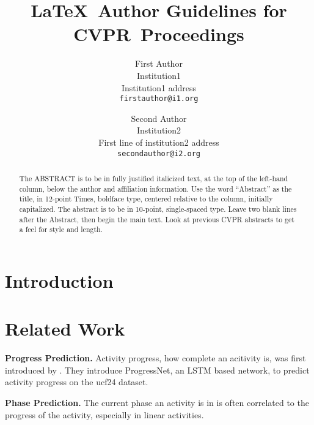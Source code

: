 \documentclass[10pt,twocolumn,letterpaper]{article}
\def\confName{CVPR}
\begin{document}
\title{\LaTeX\ Author Guidelines for \confName~Proceedings}

\author{First Author\\
Institution1\\
Institution1 address\\
{\tt\small firstauthor@i1.org}
\and
Second Author\\
Institution2\\
First line of institution2 address\\
{\tt\small secondauthor@i2.org}
}
\maketitle

\begin{abstract}
   The ABSTRACT is to be in fully justified italicized text, at the top of the left-hand column, below the author and affiliation information.
   Use the word ``Abstract'' as the title, in 12-point Times, boldface type, centered relative to the column, initially capitalized.
   The abstract is to be in 10-point, single-spaced type.
   Leave two blank lines after the Abstract, then begin the main text.
   Look at previous CVPR abstracts to get a feel for style and length.
\end{abstract}

\section{Introduction}
\label{sec:intro}


\section{Related Work}
\label{sec:related}

\textbf{Progress Prediction.} Activity progress, how complete an acitivity is, was first introduced by \cite{becattini2017}. They introduce ProgressNet, an LSTM based network, to predict activity progress on the ucf24 dataset.

\textbf{Phase Prediction.} The current phase an activity is in is often correlated to the progress of the activity, especially in linear activities. 
\end{document}
